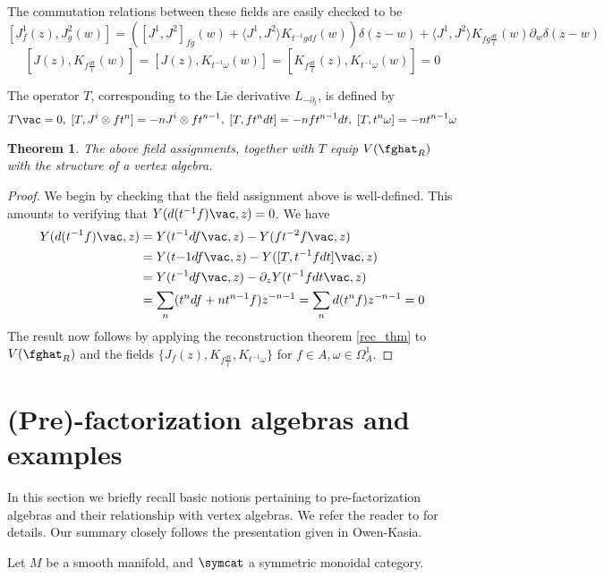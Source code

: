 \documentclass[12pt]{amsart}
\newtheorem{theorem}{Theorem}[section]
\theoremstyle{definition}
\theoremstyle{remark}
\newcommand{\R}{R}
\begin{document}
The commutation relations between these fields are easily checked to be
$$
[J^1_f (z), J^2_g (w)] = \left( [J^1, J^2]_{fg} (w) + \langle J^1, J^2 \rangle  K_{t^{-1} g df} (w)      \right) \delta(z-w) + \langle J^1, J^2 \rangle K_{fg \frac{dt}{t}} (w) \partial_w \delta(z-w)
$$
$$
[J(z), K_{f \frac{dt}{t}}(w) ] = [J(z), K_{t^{-1} \omega} (w)] = [ K_{f \frac{dt}{t}}(z),  K_{t^{-1} \omega} (w)] =0
$$

The operator $T$, corresponding to the Lie derivative $L_{-\partial_t}$, is defined by
\[
T \vac =0, \; [T, J^i \otimes f t^n] = -n J^i \otimes f t^{n-1}, \; [T, f t^n dt] = -n f t^{n-1} dt, \; [T, t^n \omega] = -n t^{n-1} \omega
\]

\begin{theorem}
The above field assignments, together with $T$ equip $V(\fghat_{\R})$ with the structure of a vertex algebra.
\end{theorem}

\begin{proof}
We begin by checking that the field assignment above is well-defined. This amounts to verifying that $Y(d(t^{-1}f)\vac,z ) =0$.  We have 
\begin{align*}
Y(d(t^{-1}f) \vac, z) &= Y(t^{-1} df \vac, z) - Y(f t^{-2} f \vac, z) \\
&= Y(t{-1} df \vac, z) - Y([T, t^{-1}f dt  ] \vac, z) \\
&= Y(t^{-1} df \vac, z) - \partial_z Y( t^{-1} f dt \vac, z) \\
&= \sum_{n} (t^n df + n t^{n-1} f) z^{-n-1} = \sum_{n} d(t^n f) z^{-n-1} = 0
\end{align*}
The result now follows by applying the reconstruction theorem \ref{rec_thm} to $V(\fghat_\R)$ and the fields $\{ J_f (z), K_{f \frac{dt}{t}}, K_{t^{-1} \omega} \}$ for $f \in A, \omega \in \Omega^{1}_A $.
\end{proof}

\section{(Pre)-factorization algebras and examples}

In this section we briefly recall basic notions pertaining to pre-factorization algebras and their relationship with vertex algebras. We refer the reader to \cite{CG} for details. Our summary closely follows the presentation given in \cite{} {\color{red} Owen-Kasia}. 

Let $M$ be a smooth manifold, and $\symcat$ a symmetric monoidal category. 
\end{document}
